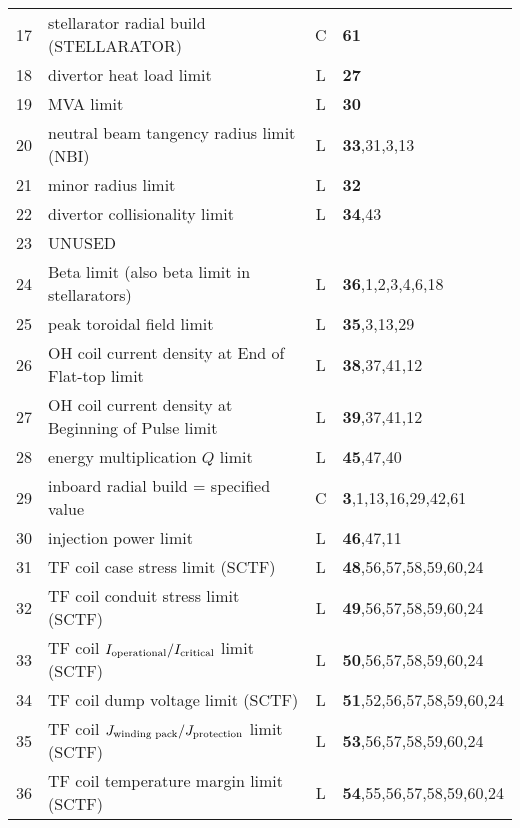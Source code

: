 \documentclass[11pt,a4paper]{report}
\begin{document}
\begin{table}[tbph]
\begin{center}
\begin{tabular}{||c|l|c|l||}
17  & stellarator radial build (STELLARATOR)              & C    & \textbf{61} \\
18  & divertor heat load limit                            & L    & \textbf{27} \\
19  & MVA limit                                           & L    & \textbf{30} \\
20  & neutral beam tangency radius limit (NBI)            & L    & \textbf{33},31,3,13 \\
21  & minor radius limit                                  & L    & \textbf{32} \\
22  & divertor collisionality limit                       & L    & \textbf{34},43 \\
23  & UNUSED                                              &      & \\
24  & Beta limit (also beta limit in stellarators)        & L    & \textbf{36},1,2,3,4,6,18 \\
25  & peak toroidal field limit                           & L    & \textbf{35},3,13,29 \\
26  & OH coil current density at End of Flat-top limit    & L    & \textbf{38},37,41,12 \\
27  & OH coil current density at Beginning of Pulse limit & L    & \textbf{39},37,41,12 \\
28  & energy multiplication $Q$ limit                     & L    & \textbf{45},47,40 \\
29  & inboard radial build = specified value              & C    & \textbf{3},1,13,16,29,42,61 \\
30  & injection power limit                               & L    & \textbf{46},47,11 \\
31  & TF coil case stress limit (SCTF)                    & L    & \textbf{48},56,57,58,59,60,24 \\
32  & TF coil conduit stress limit (SCTF)                 & L    & \textbf{49},56,57,58,59,60,24 \\
33  & TF coil $I_{\mbox{\scriptsize operational}}/
I_{\mbox{\scriptsize critical}}$ limit (SCTF)                 & L    & \textbf{50},56,57,58,59,60,24 \\
34  & TF coil dump voltage limit (SCTF)                   & L    & \textbf{51},52,56,57,58,59,60,24 \\
35  & TF coil $J_{\mbox{\scriptsize winding pack}}/
J_{\mbox{\scriptsize protection}}$ limit (SCTF)               & L    & \textbf{53},56,57,58,59,60,24 \\
36  & TF coil temperature margin limit (SCTF)             & L    & \textbf{54},55,56,57,58,59,60,24 \\

\end{tabular}
\end{center}
\end{table}
\end{document}
